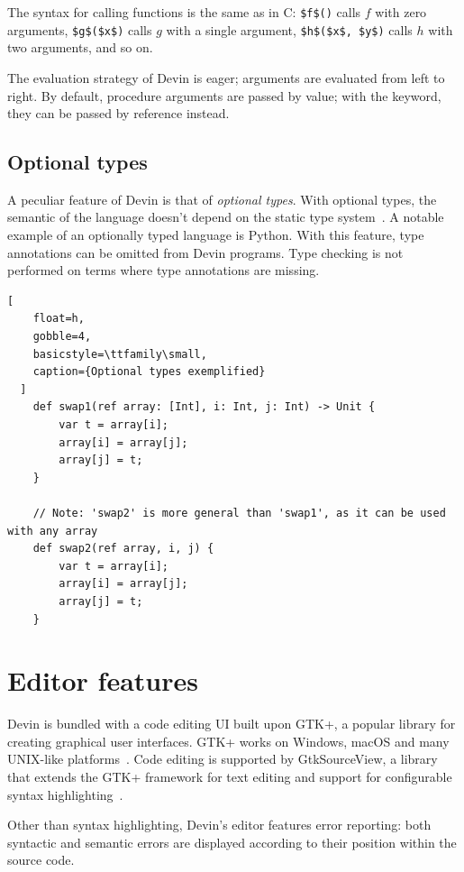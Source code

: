 \documentclass[UdineBachThesis,american,11pt]{PhdThesis}
\begin{document}
  The syntax for calling functions is the same as in C:
  \lstinline[mathescape]@$f$()@ calls $f$ with zero arguments,
  \lstinline[mathescape]@$g$($x$)@ calls $g$ with a single argument,
  \lstinline[mathescape]@$h$($x$, $y$)@ calls $h$ with two arguments, and so on.

  The evaluation strategy of Devin is eager; arguments are evaluated from left
  to right. By default, procedure arguments are passed by value; with the
  \lstinline@ref@ keyword, they can be passed by reference instead.

  \subsection{Optional types}

  A peculiar feature of Devin is that of \emph{optional types}. With optional
  types, the semantic of the language doesn't depend on the static type
  system~\cite{pluggable-type-systems}. A notable example of an optionally typed
  language is Python. With this feature, type annotations can be omitted from
  Devin programs. Type checking is not performed on terms where type annotations
  are missing.

  \begin{lstlisting}[
    float=h,
    gobble=4,
    basicstyle=\ttfamily\small,
    caption={Optional types exemplified}
  ]
    def swap1(ref array: [Int], i: Int, j: Int) -> Unit {
        var t = array[i];
        array[i] = array[j];
        array[j] = t;
    }

    // Note: 'swap2' is more general than 'swap1', as it can be used with any array
    def swap2(ref array, i, j) {
        var t = array[i];
        array[i] = array[j];
        array[j] = t;
    }
  \end{lstlisting}

  \section{Editor features}
  \label{section:editor-features}

  Devin is bundled with a code editing UI built upon GTK+, a popular library for
  creating graphical user interfaces. GTK+ works on Windows, macOS and many
  UNIX-like platforms~\cite{gtk+}. Code editing is supported by GtkSourceView, a
  library that extends the GTK+ framework for text editing and support for
  configurable syntax highlighting~\cite{gtksourceview}.

  Other than syntax highlighting, Devin's editor features error reporting: both
  syntactic and semantic errors are displayed according to their position within
  the source code.
\end{document}
